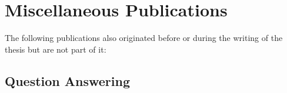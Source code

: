 
\section*{Miscellaneous Publications}
The following publications also originated before or during the writing of the thesis but are not part of it:

\subsection*{Question Answering}

